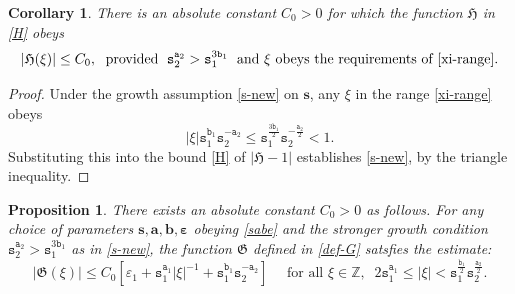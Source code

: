 \documentclass[12pt, twoside]{article}
\newtheorem{proposition}[theorem]{Proposition}
\newtheorem{corollary}[theorem]{Corollary}
\theoremstyle{definition}
\numberwithin{equation}{section}
\begin{document}
\begin{corollary} \label{H-cor} 
There is an absolute constant $C_0 > 0$ for which the function $\mathfrak H$ in \eqref{H} obeys
\begin{equation} \label{s-new}
 |\mathfrak{H}(\xi)| \leq C_0, \; \text{ provided } \; \mathtt s_2^{\mathtt a_2} > \mathtt s_1^{3\mathtt b_1} \; \text{ and  $\xi$ obeys the requirements of \eqref{xi-range}}. 
\end{equation} 
\end{corollary} 
\begin{proof} 
Under the growth assumption \eqref{s-new} on $\mathbf s$, any $\xi$ in the range \eqref{xi-range} obeys 
\[ |\xi| \mathtt s_1^{\mathtt b_1} \mathtt s_2^{-\mathtt a_2} \leq \mathtt s_1^{\frac{3 \mathtt b_1}{2}} \mathtt s_2^{-\frac{\mathtt a_2}{2}} < 1. \]
Substituting this into the bound \eqref{H} of $|\mathfrak H - 1|$ establishes \eqref{s-new}, by the triangle inequality.    
\end{proof}
\begin{proposition} \label{prop-G} 
There exists an absolute constant $C_0 > 0$ as follows. For any choice of parameters $\mathbf s, \mathbf a, \mathbf b, \pmb{\varepsilon}$ obeying \eqref{sabe} and the stronger growth condition $\mathtt s_2^{\mathtt a_2} > \mathtt s_1^{3\mathtt b_1}$ as in \eqref{s-new}, the function $\mathfrak G$ defined in \eqref{def-G} satsfies the estimate: 
\begin{equation} \label{G-est}
|\mathfrak G(\xi)| \leq C_0 \left[ \varepsilon_1 + \mathtt s_1^{\mathtt a_1} |\xi|^{-1} + \mathtt s_1^{\mathtt b_1} \mathtt s_2^{-\mathtt a_2} \right]
\quad \text{ for all } \xi \in \mathbb Z, \; \; 2 \mathtt s_1^{\mathtt a_1} \leq |\xi| < \mathtt s_1^{\frac{\mathtt b_1}{2}}\mathtt s_2^{\frac{\mathtt a_2}{2}}.   
\end{equation} 
\end{proposition} 
\end{document}
